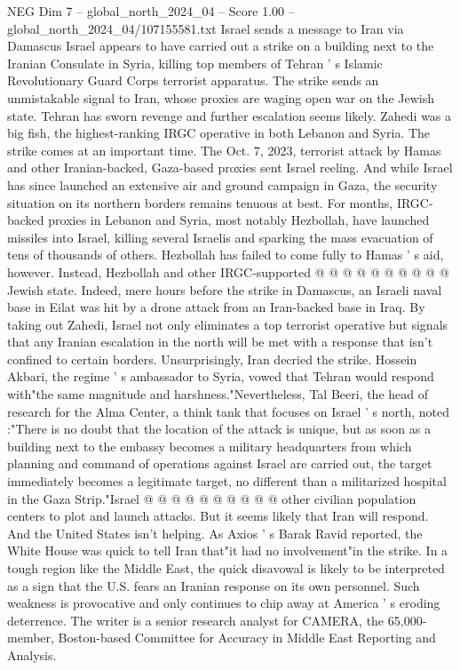 \begin{textsample}{NEG Dim 7 – global\_north\_2024\_04 – Score 1.00 – global\_north\_2024\_04/107155581.txt}  \label{ex:f7_neg_394}
Israel sends a message to Iran via Damascus Israel appears to have carried out a strike on a building next to the Iranian Consulate in Syria, killing top members of Tehran ' s Islamic Revolutionary Guard Corps terrorist apparatus.
The strike sends an unmistakable signal to Iran, whose proxies are waging open war on the Jewish state.
Tehran has sworn revenge and further escalation seems likely.
Zahedi was a big fish, the highest-ranking IRGC operative in both Lebanon and Syria.
The strike comes at an important time.
The Oct. 7, 2023, terrorist attack by Hamas and other Iranian-backed, Gaza-based proxies sent Israel reeling.
And while Israel has since launched an extensive air and ground campaign in Gaza, the security situation on its northern borders remains tenuous at best.
For months, IRGC-backed proxies in Lebanon and Syria, most notably Hezbollah, have launched missiles into Israel, killing several Israelis and sparking the mass evacuation of tens of thousands of others.
Hezbollah has failed to come fully to Hamas ' s aid, however.
Instead, Hezbollah and other IRGC-supported @ @ @ @ @ @ @ @ @ @ Jewish state.
Indeed, mere hours before the strike in Damascus, an Israeli naval base in Eilat was hit by a drone attack from an Iran-backed base in Iraq.
By taking out Zahedi, Israel not only eliminates a top terrorist operative but signals that any Iranian escalation in the north will be met with a response that isn't confined to certain borders.
Unsurprisingly, Iran decried the strike.
Hossein Akbari, the regime ' s ambassador to Syria, vowed that Tehran would respond with"the same magnitude and harshness."Nevertheless, Tal Beeri, the head of research for the Alma Center, a think tank that focuses on Israel ' s north, noted :"There is no doubt that the location of the attack is unique, but as soon as a building next to the embassy becomes a military headquarters from which planning and command of operations against Israel are carried out, the target immediately becomes a legitimate target, no different than a militarized hospital in the Gaza Strip."Israel @ @ @ @ @ @ @ @ @ @ other civilian population centers to plot and launch attacks.
But it seems likely that Iran will respond.
And the United States isn't helping.
As Axios ' s Barak Ravid reported, the White House was quick to tell Iran that"it had no involvement"in the strike.
In a tough region like the Middle East, the quick disavowal is likely to be interpreted as a sign that the U.S. fears an Iranian response on its own personnel.
Such weakness is provocative and only continues to chip away at America ' s eroding deterrence.
The writer is a senior research analyst for CAMERA, the 65,000-member, Boston-based Committee for Accuracy in Middle East Reporting and Analysis.

\end{textsample}
